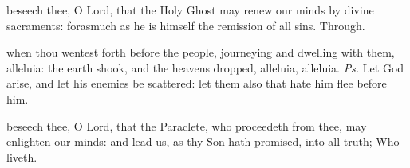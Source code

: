 

\vspace{-0.25\baselineskip}

\postcommunion
{} beseech thee, O Lord, that the Holy Ghost may renew our minds by divine sacraments: forasmuch as he is himself the remission of all sins. Through.



\vspace{-0.25\baselineskip}

\introit
{} when thou wentest forth before the people, journeying and dwelling with them, alleluia: the earth shook, and the heavens dropped, alleluia, alleluia. \textit{Ps.} Let God arise, and let his enemies be scattered: let them also that hate him flee before him.

\vspace{-0.25\baselineskip}

\collect
{} beseech thee, O Lord, that the Paraclete, who proceedeth from thee, may enlighten our minds: and lead us, as thy Son hath promised, into all truth; Who liveth.

